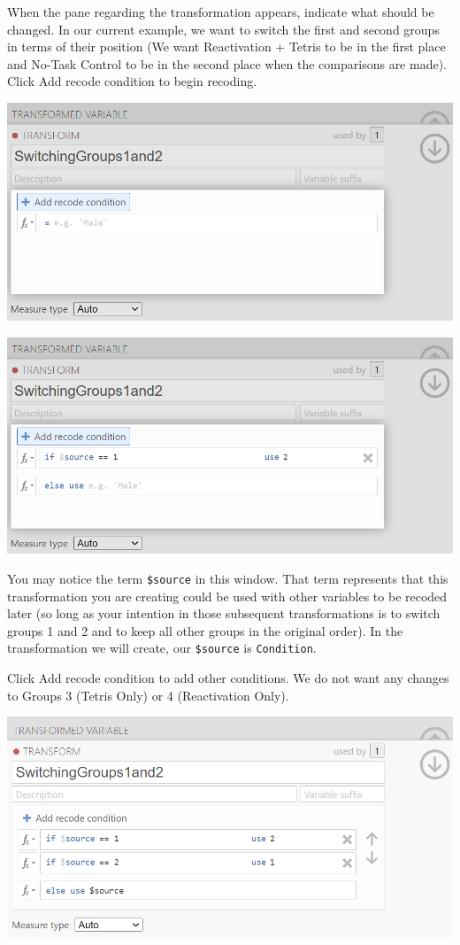 \documentclass[
]{book}
\begin{document}
When the pane regarding the transformation appears, indicate what should be changed. In our current example, we want to switch the first and second groups in terms of their position (We want Reactivation + Tetris to be in the first place and No-Task Control to be in the second place when the comparisons are made). Click {Add recode condition} to begin recoding.

\includegraphics{img/TransformationForPlannedContrasts.png}

\includegraphics{img/TransformationForPlannedContrasts2.png}

You may notice the term \texttt{\$source} in this window. That term represents that this transformation you are creating could be used with other variables to be recoded later (so long as your intention in those subsequent transformations is to switch groups 1 and 2 and to keep all other groups in the original order). In the transformation we will create, our \texttt{\$source} is \texttt{Condition}.

Click {Add recode condition} to add other conditions. We do not want any changes to Groups 3 (Tetris Only) or 4 (Reactivation Only).

\includegraphics{img/TransformationForPlannedContrasts3.png}
\end{document}
